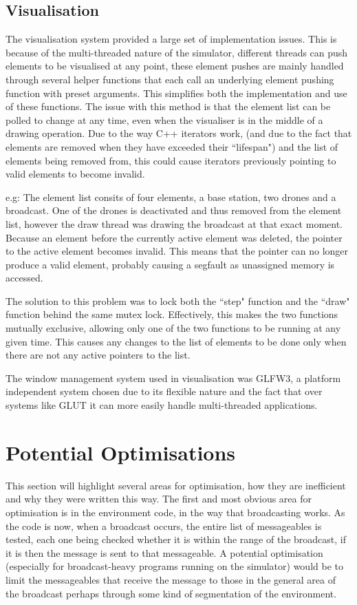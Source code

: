 	\subsection{Visualisation}
		The visualisation system provided a large set of implementation issues. This is because of the multi-threaded nature
		of the simulator, different threads can push elements to be visualised at any point, these element pushes are mainly
		handled through several helper functions that each call an underlying element pushing function with preset arguments.
		This simplifies both the implementation and use of these functions. The issue with this method is that the element list
		can be polled to change at any time, even when the visualiser is in the middle of a drawing operation. Due to the way
		C++ iterators work, (and due to the fact that elements are removed when they have exceeded their ``lifespan") and the
		list of elements being removed from, this could cause iterators previously pointing to valid elements to become invalid.

		e.g: The element list consits of four elements, a base station, two drones and a broadcast. One of the drones is
		deactivated and thus removed from the element list, however the draw thread was drawing the broadcast at that exact
		moment. Because an element before the currently active element was deleted, the pointer to the active element becomes
		invalid. This means that the pointer can no longer produce a valid element, probably causing a segfault as unassigned
		memory is accessed.

		The solution to this problem was to lock both the ``step" function and the ``draw" function behind the same mutex lock.
		Effectively, this makes the two functions mutually exclusive, allowing only one of the two functions to be running at any
		given time. This causes any changes to the list of elements to be done only when there are not any active pointers to the
		list.

		The window management system used in visualisation was GLFW3, a platform independent system chosen due to its flexible
		nature and the fact that over systems like GLUT it can more easily handle multi-threaded applications.

\section{Potential Optimisations}
	This section will highlight several areas for optimisation, how they are inefficient and why they were written this way.
	The first and most obvious area for optimisation is in the environment code, in the way that broadcasting works. As the
	code is now, when a broadcast occurs, the entire list of messageables is tested, each one being checked whether it is
	within the range of the broadcast, if it is then the message is sent to that messageable. A potential optimisation 
	(especially for broadcast-heavy programs running on the simulator) would be to limit the messageables that receive the
	message to those in the general area of the broadcast perhaps through some kind of segmentation of the environment.

